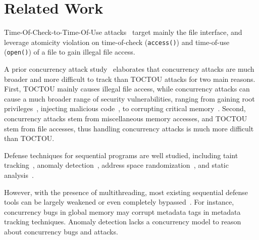 \section{Related Work} \label{sec:related}


Time-Of-Check-to-Time-Of-Use attacks~\cite{bishop:tocttou,toctou:fast08, 
toctou:fast05,toctou:usec03} target 
mainly the file interface, and leverage atomicity violation on 
time-of-check (\texttt{access()}) and time-of-use (\texttt{open()}) of
a file to gain illegal file access.

A prior concurrency attack study~\cite{con:hotpar12} elaborates that 
concurrency attacks are much broader and more difficult to track than TOCTOU 
attacks for two main reasons. First, TOCTOU mainly causes illegal file access, 
while concurrency attacks can cause a much broader range of security 
vulnerabilities, ranging from gaining root privileges~\cite{uselib-bug-12791}, 
injecting malicious code~\cite{freebsd-exploit-2009-3527}, to corrupting 
critical memory~\cite{apache-bug-25520}. Second, concurrency attacks stem from 
miscellaneous memory accesses, and TOCTOU stem from file accesses, 
thus handling concurrency attacks is much more difficult than TOCTOU.


 Defense techniques for sequential
programs are well studied, including
taint tracking~\cite{taintdroid:osdi10,
lift:micro06,myers:information,valgrind:pldi}, anomaly
detection~\cite{taskrecycling:ppopp90,schonberg:pldi89}, address space
randomization~\cite{ aslr-fail:ccs04}, and static
analysis~\cite{seth:pldi,engler:vmcai,wagner:syscall:ids,coverity:cacm,
klee:osdi08}.

However, with the presence of multithreading, most existing sequential defense 
tools can be largely weakened or even completely bypassed~\cite{con:hotpar12}. For 
instance, concurrency bugs in global memory may corrupt metadata tags in 
metadata tracking techniques. Anomaly detection lacks a concurrency model to 
reason about concurrency bugs and attacks.

